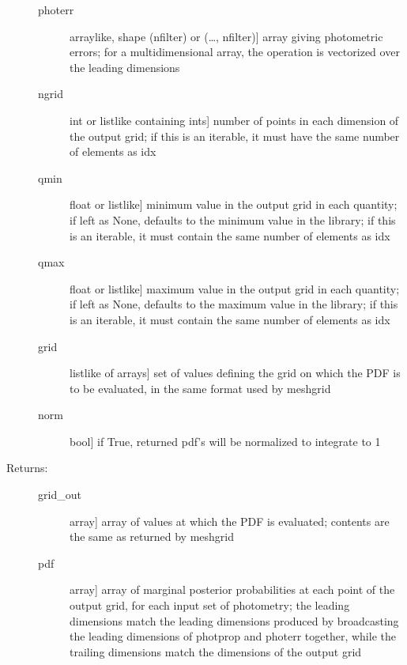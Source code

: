 \documentclass[letterpaper,10pt,english]{sphinxmanual}
\begin{document}
\begin{fulllineitems}
\begin{fulllineitems}
\begin{description}
\begin{description}
\item[{photerr}] \leavevmode{[}arraylike, shape (nfilter) or (…, nfilter){]}
array giving photometric errors; for a multidimensional
array, the operation is vectorized over the leading
dimensions

\item[{ngrid}] \leavevmode{[}int or listlike containing ints{]}
number of points in each dimension of the output grid;
if this is an iterable, it must have the same number of
elements as idx

\item[{qmin}] \leavevmode{[}float or listlike{]}
minimum value in the output grid in each quantity; if
left as None, defaults to the minimum value in the
library; if this is an iterable, it must contain the
same number of elements as idx

\item[{qmax}] \leavevmode{[}float or listlike{]}
maximum value in the output grid in each quantity; if
left as None, defaults to the maximum value in the
library; if this is an iterable, it must contain the
same number of elements as idx

\item[{grid}] \leavevmode{[}listlike of arrays{]}
set of values defining the grid on which the PDF is to
be evaluated, in the same format used by meshgrid

\item[{norm}] \leavevmode{[}bool{]}
if True, returned pdf’s will be normalized to integrate
to 1

\end{description}

\item[{Returns:}] \leavevmode\begin{description}
\item[{grid\_out}] \leavevmode{[}array{]}
array of values at which the PDF is evaluated; contents
are the same as returned by meshgrid

\item[{pdf}] \leavevmode{[}array{]}
array of marginal posterior probabilities at each point
of the output grid, for each input set of photometry; the leading
dimensions match the leading dimensions produced by
broadcasting the leading dimensions of photprop and
photerr together, while the trailing dimensions match
the dimensions of the output grid

\end{description}

\end{description}


\end{fulllineitems}
\end{fulllineitems}
\end{document}
